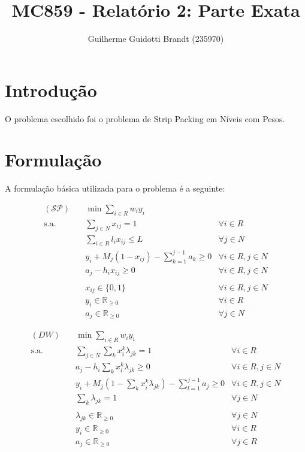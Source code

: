 \documentclass{article}
\title{MC859 - Relatório 2: Parte Exata}
\author{Guilherme Guidotti Brandt (235970)}
\date{}
\begin{document}
\maketitle

\section{Introdução}

O problema escolhido foi o problema de Strip Packing em Níveis com Pesos.

\section{Formulação}

A formulação básica utilizada para o problema é a seguinte:

\begin{align}
    (\mathcal{SP})\quad
        &\min \sum_{i \in R} w_i y_i\nonumber\\
    \text{s.a.}\quad
        &\sum_{j \in N} x_{ij} = 1                                  & \forall i \in R\\
        &\sum_{i \in R} l_i x_{ij} \leq L                           & \forall j \in N\\
        &y_i + M_j (1 - x_{ij}) - \sum_{k = 1}^{j - 1} a_k \geq 0   & \forall i \in R, j \in N\\
        &a_j - h_i x_{ij} \geq 0                                    & \forall i \in R, j \in N\\
        \nonumber\\
        &x_{ij} \in \{0, 1\}                                        & \forall i \in R, j \in N\nonumber\\
        &y_i \in \mathbb{R}_{\geq 0}                                & \forall i \in R\nonumber\\
        &a_j \in \mathbb{R}_{\geq 0}                                & \forall j \in N\nonumber
\end{align}

\begin{align}
    (DW)\quad
        &\min \sum_{i \in R} w_i y_i \nonumber\\
    \text{s.a.}\quad
        &\sum_{j \in N} \sum_k x_i^k \lambda_{jk} = 1       & \forall i \in R\\
        &a_j - h_i \sum_k x_i^k \lambda_{jk} \geq 0                            & \forall i \in R, j \in N\\
        &y_i + M_j \left(1 - \sum_k x_i^k \lambda_{jk} \right) - \sum_{l = 1}^{j - 1} a_j \geq 0 & \forall i \in R, j \in N\\
        &\sum_k \lambda_{jk} = 1                            & \forall j \in N\\
        \nonumber\\
        &\lambda_{jk} \in \mathbb{R}_{\geq 0}               & \forall j \in N\nonumber\\
        &y_i \in \mathbb{R}_{\geq 0}                        & \forall i \in R\nonumber\\
        &a_j \in \mathbb{R}_{\geq 0}                        & \forall j \in R\nonumber
\end{align}
\end{document}
